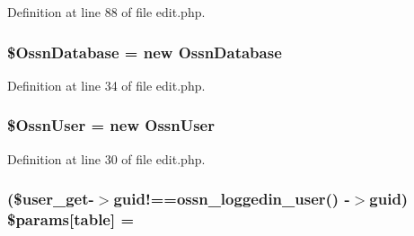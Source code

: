 Definition at line 88 of file edit.\+php.

\subsubsection[{\texorpdfstring{\$\+Ossn\+Database}{$OssnDatabase}}]{\setlength{\rightskip}{0pt plus 5cm}\${\bf Ossn\+Database} = new {\bf Ossn\+Database}}\hypertarget{components_2_ossn_profile_2actions_2edit_8php_a8579dda900a1e2336bb710006263bc02}{}\label{components_2_ossn_profile_2actions_2edit_8php_a8579dda900a1e2336bb710006263bc02}


Definition at line 34 of file edit.\+php.

\subsubsection[{\texorpdfstring{\$\+Ossn\+User}{$OssnUser}}]{\setlength{\rightskip}{0pt plus 5cm}\${\bf Ossn\+User} = new {\bf Ossn\+User}}\hypertarget{components_2_ossn_profile_2actions_2edit_8php_a51d9a97b3f5090e1d74fb31d06de0938}{}\label{components_2_ossn_profile_2actions_2edit_8php_a51d9a97b3f5090e1d74fb31d06de0938}


Definition at line 30 of file edit.\+php.

\subsubsection[{\texorpdfstring{\$params}{$params}}]{ (\$user\+\_\+get-\/$>$guid!=={\bf ossn\+\_\+loggedin\+\_\+user}() -\/$>$guid) \$params\mbox{[}\textquotesingle{}table\textquotesingle{}\mbox{]} = \textquotesingle{}}\hypertarget{components_2_ossn_profile_2actions_2edit_8php_a043d4825362730eeb2dcfd9a746b9369}{}\label{components_2_ossn_profile_2actions_2edit_8php_a043d4825362730eeb2dcfd9a746b9369}


